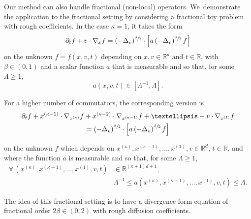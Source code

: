 \documentclass[10pt,a4paper]{amsart}
\theoremstyle{definition}
\newcommand\R{{\mathbb R}}
\begin{document}
Our method can also handle fractional (non-local) operators. We~demonstrate the
application to the fractional setting by considering a fractional toy problem
with rough coefficients. In the case \(\kappa=1\), it takes the form
\begin{equation}
\label{eq:kolmo-nonloc}
\partial_t f + v \cdot \nabla_x f = \left(- \Delta_v
\right)^{\sfrac{\beta}{2}} \cdot \left[ a
\left(- \Delta_v \right)^{\sfrac{\beta}{2}} f \right]
\end{equation}
on the unknown $f=f(x,v,t)$ depending on $x,v \in \R^d$ and
$t \in \R$, with $\beta \in (0,1)$ and a scalar function $a$ that
is measurable and so that, for some $\Lambda \ge 1$,
\begin{equation}
\label{eq:ellip1-frac}
a(x,v,t) \in [\Lambda^{-1},\Lambda].
\end{equation}
\noindent
\begin{minipage}{\textwidth}
For a higher number of commutators, the corresponding version is
\begin{multline}
\label{eq:kolmo-nonloc-k}
\partial_t f + x^{(\kappa-1)} \cdot \nabla_{x^{(\kappa)}} f
+ x^{(\kappa-2)} \cdot \nabla_{x^{(\kappa-1)}} f +
\dots + v \cdot \nabla_{x^{(1)}} f\\
=
\left(- \Delta_v \right)^{\sfrac{\beta}{2}} \cdot \Bigl[ a
\left(- \Delta_v \right)^{\sfrac{\beta}{2}} f \Bigr]
\end{multline}
\end{minipage}
\par\smallskip\noindent
on the unknown $f$ which depends on
$x^{(\kappa)},x^{(\kappa-1)}, \dots, x^{(1)},v \in \R^d$,
$t \in \R$, and where the function $a$ is measurable and so that,
for some $\Lambda \ge 1$,
\begin{equation}
\begin{aligned}
\label{eq:ellipk}
\forall \, (x^{(\kappa)},x^{(\kappa-1)}, \dots, x^{(1)},v,t)
&\in \R^{(\kappa+1)d+1}, \\
&\Lambda^{-1} \le
a(x^{(\kappa)},x^{(\kappa-1)},\dots,x^{(1)},v,t) \le \Lambda.
\end{aligned}
\end{equation}

The idea of this fractional setting is to have a divergence form equation of
fractional order $2\beta \in (0, 2)$ with rough diffusion coefficients.
\end{document}
